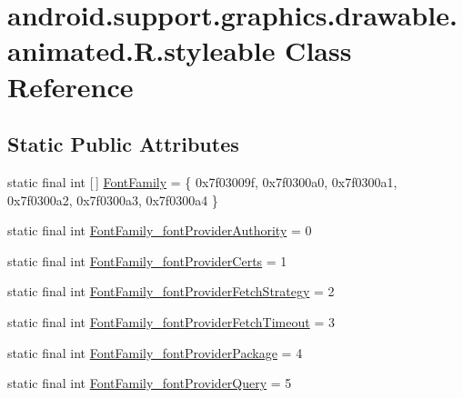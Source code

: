 \hypertarget{classandroid_1_1support_1_1graphics_1_1drawable_1_1animated_1_1R_1_1styleable}{}\section{android.\+support.\+graphics.\+drawable.\+animated.\+R.\+styleable Class Reference}
\label{classandroid_1_1support_1_1graphics_1_1drawable_1_1animated_1_1R_1_1styleable}
\subsection*{Static Public Attributes}
\begin{DoxyCompactItemize}
\item 
static final int \mbox{[}$\,$\mbox{]} \mbox{\hyperlink{classandroid_1_1support_1_1graphics_1_1drawable_1_1animated_1_1R_1_1styleable_a1f2454ad7d6b6aa9d74c5b9ee6507f41}{Font\+Family}} = \{ 0x7f03009f, 0x7f0300a0, 0x7f0300a1, 0x7f0300a2, 0x7f0300a3, 0x7f0300a4 \}
\item 
static final int \mbox{\hyperlink{classandroid_1_1support_1_1graphics_1_1drawable_1_1animated_1_1R_1_1styleable_a8f6f7c2091c3f4760f5ddaf8647de3ab}{Font\+Family\+\_\+font\+Provider\+Authority}} = 0
\item 
static final int \mbox{\hyperlink{classandroid_1_1support_1_1graphics_1_1drawable_1_1animated_1_1R_1_1styleable_a8f48bd621a033f8533c863b77c5f1ecc}{Font\+Family\+\_\+font\+Provider\+Certs}} = 1
\item 
static final int \mbox{\hyperlink{classandroid_1_1support_1_1graphics_1_1drawable_1_1animated_1_1R_1_1styleable_a9132a3c3cbc42ac22c69fd63ea2f0aaf}{Font\+Family\+\_\+font\+Provider\+Fetch\+Strategy}} = 2
\item 
static final int \mbox{\hyperlink{classandroid_1_1support_1_1graphics_1_1drawable_1_1animated_1_1R_1_1styleable_a26e58b8226dabd8e5e105562c4459cf6}{Font\+Family\+\_\+font\+Provider\+Fetch\+Timeout}} = 3
\item 
static final int \mbox{\hyperlink{classandroid_1_1support_1_1graphics_1_1drawable_1_1animated_1_1R_1_1styleable_ae01a830a725d0de14d44a88c59357f17}{Font\+Family\+\_\+font\+Provider\+Package}} = 4
\item 
static final int \mbox{\hyperlink{classandroid_1_1support_1_1graphics_1_1drawable_1_1animated_1_1R_1_1styleable_a86c4d4d58391ae3f1849a8099767a90f}{Font\+Family\+\_\+font\+Provider\+Query}} = 5

\end{DoxyCompactItemize}
